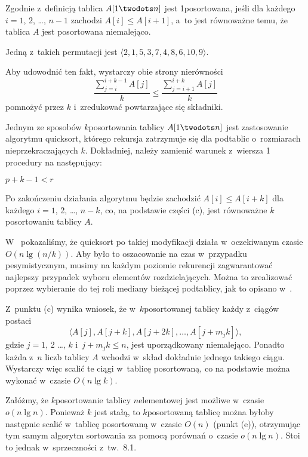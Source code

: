 
\subproblem %
Zgodnie z~definicją tablica $A[1\twodots n]$ jest 1\nbhyphen posortowana, jeśli dla każdego $i=1$, 2, \dots, $n-1$ zachodzi $A[i]\le A[i+1]$, a~to jest równoważne temu, że tablica $A$ jest posortowana niemalejąco.

\subproblem %
Jedną z~takich permutacji jest $\langle2,1,5,3,7,4,8,6,10,9\rangle$.

\subproblem %
Aby udowodnić ten fakt, wystarczy obie strony nierówności
\[
	\frac{\sum_{j=i}^{i+k-1}A[j]}{k} \le \frac{\sum_{j=i+1}^{i+k}A[j]}{k}
\]
pomnożyć przez $k$ i~zredukować powtarzające się składniki.

\subproblem %
Jednym ze sposobów $k$\nbhyphen posortowania tablicy $A[1\twodots n]$ jest zastosowanie algorytmu quicksort, którego rekursja zatrzymuje się dla podtablic o~rozmiarach nieprzekraczających $k$.
Dokładniej, należy zamienić warunek z~wiersza 1 procedury  na następujący:
\begin{codebox}
\li	\If $p+k-1<r$
\end{codebox}
Po zakończeniu działania algorytmu będzie zachodzić $A[i]\le A[i+k]$ dla każdego $i=1$, 2, \dots, $n-k$, co, na podstawie części (c), jest równoważne $k$\nbhyphen posortowaniu tablicy $A$.

W~ pokazaliśmy, że quicksort po takiej modyfikacji działa w~oczekiwanym czasie $O(n\lg(n/k))$.
Aby było to oszacowanie na czas w~przypadku pesymistycznym, musimy na każdym poziomie rekurencji zagwarantować najlepszy przypadek wyboru elementów rozdzielających.
Można to zrealizować poprzez wybieranie do tej roli mediany bieżącej podtablicy, jak to opisano w~.

\subproblem %
Z~punktu (c) wynika wniosek, że w~$k$\nbhyphen posortowanej tablicy każdy z~ciągów postaci
\[
    \langle A[j],A[j+k],A[j+2k],\dots,A[j+m_jk]\rangle,
\]
gdzie $j=1$, 2 \dots, $k$ i~$j+m_jk\le n$, jest uporządkowany niemalejąco.
Ponadto każda z~$n$ liczb tablicy $A$ wchodzi w~skład dokładnie jednego takiego ciągu.
Wystarczy więc scalić te ciągi w~tablicę posortowaną, co na podstawie  można wykonać w~czasie $O(n\lg k)$.

\subproblem %
Załóżmy, że $k$\nbhyphen posortowanie tablicy $n$\nbhyphen elementowej jest możliwe w~czasie $o(n\lg n)$.
Ponieważ $k$ jest stałą, to $k$\nbhyphen posortowaną tablicę można byłoby następnie scalić w~tablicę posortowaną w~czasie $O(n)$ (punkt (e)), otrzymując tym samym algorytm sortowania za pomocą porównań o~czasie $o(n\lg n)$.
Stoi to jednak w~sprzeczności z~tw.\ 8.1.
